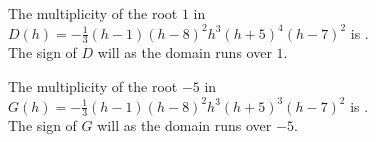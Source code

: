 \documentclass{ximera}
\begin{document}
\begin{exercise}
\begin{question}



The multiplicity of the root $1$ in $D(h) = -\frac{1}{3} (h - 1) (h - 8)^2 h^3 (h + 5)^4 (h - 7)^2$ is . \\


The sign of $D$ will  as the domain runs over $1$.




\end{question}












\begin{question}



The multiplicity of the root $-5$ in $G(h) = -\frac{1}{3} (h - 1) (h - 8)^2 h^3 (h + 5)^3 (h - 7)^2$ is . \\



The sign of $G$ will  as the domain runs over $-5$.




\end{question}








\end{exercise}
\end{document}
